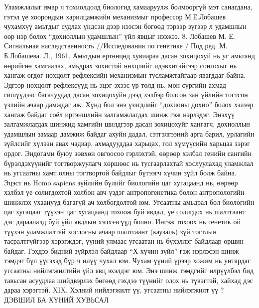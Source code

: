 Уламжлалыг ямар ч тохиолдолд биологид хамааруулж болмооргүй мэт санагдана, гэтэл үе хоорондын харилцамжийн механизмыг профессор М.Е.Лобашев чухамхүү амьтдыг судлах үндсэн дээр нээсэн бөгөөд тэрээр зүгээр л удамшлын өөр нэр болох “дохиоллын удамшлын” үйл явцыг нээжээ. 8. Лобашев М. Е. Сигнальная наследственность //Исследования по генетике / Под ред. М. Б.Лобашева. Л., 1961.
Амьтдын ертөнцөд хувиараа дасан зохицохуй нь уг амьтанд өөрийгөө хамгаалах, амьдрах зохистой нөхцлийг идэвхитэйгээр сонгохыг нь хангаж өгдөг нөхцөлт рефлексийн механизмын тусламжтайгаар явагддаг байна. Эдгээр нөхцөлт рефлексүүд нь эцэг эхээс үр төлд нь, мөн сүргийн ахмад гишүүдээс багачуудад дасан зохицохуйн дээд хэлбэр болсон зан үйлийн тогтсон үзлийн ачаар дамждаг аж. Хүнд бол энэ үзэгдлийг “дохионы дохио” болох хэлээр хангаж байдаг соёл иргэншлийн залгамжлагдах шинж гэж нэрлэдэг. Энэхүү залгамжлагдах шинжид хамгийн шилдгээр дасан зохицохуйг хангагч, дохиоллын удамшлын замаар дамжиж байдаг ахуйн дадал, сэтгэлгээний арга барил, урлагийн зүйлсийг хүлээн авах чадвар, ахмадууддаа харьцах, гол хүмүүсийн харьцаа зэрэг ордог. Эндогами буюу зөвхөн овгоосоо гэрлэхтэй, өөрөөр хэлбэл генийн сангийн бүрэлдэхүүнийг тогтворжуулагч хөршөөс нь тусгаарлахтай хослуулахад уламжлал нь угсаатны хамт олны тогтвортой байдлыг бүтээгч хүчин зүйл болж байна.
Эцэст нь Homo sapiens зүйлийн бүлийг биологийн цаг хугацаанд нь, өөрөөр хэлбэл үе солигдохтой холбон авч үздэг антропогенетика болон антропологийн шинжлэх ухаанууд багагүй ач холбогдолтой юм. Угсаатны амьдрал бол биологийн цаг хугацааг түүхэн цаг хугацаанд тохоож буй явдал, үе солигдох нь шалтгаант дэс дараалалд буй үйл явдлын хэлхээсүүд болно. Ингэж тохоох нь генетик ой түүхэн уламжлалтай хослосны ачаар шалтгаант (каузаль) зүй тогтлын тасралтгүйгээр хэрэгждэг, үүний улмаас угсаатан нь бүхэллэг байдлаар оршин байдаг.
Гэхдээ бидний зүйрлэл байдлаар “Х хүчин зүйл” гэж нэрлэсэн шинж тэмдэг бүл үүсэхэд бүр ч илүү чухал юм. Чухам үүний үрээр хожим нь унтардаг угсаатны нийлэгжилтийн үйл явц эхэлдэг юм. Энэ шинж тэмдгийг илрүүлбэл бид тавьсан асуудлаа шийдвэрлэх бөгөөд гэхдээ түүнийг олох нь түвэгтэй, хайхад дэс дараа хэрэгтэй.
XIX. Хэлний нийлэгжилт үү, угсаатны нийлэгжилт үү ?
ДЭВШИЛ БА ХҮНИЙ ХУВЬСАЛ
